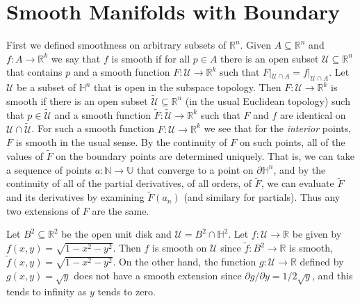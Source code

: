 \section{Smooth Manifolds with Boundary}
        First we defined smoothness on arbitrary subsets of $\mathbb{R}^{n}$.
        Given $A\subseteq\mathbb{R}^{n}$ and $f:A\rightarrow\mathbb{R}^{k}$ we
        say that $f$ is smooth if for all $p\in{A}$ there is an open subset
        $\mathcal{U}\subseteq\mathbb{R}^{n}$ that contains $p$ and a smooth
        function $F:\mathcal{U}\rightarrow\mathbb{R}^{k}$ such that
        $F|_{\mathcal{U}\cap{A}}=f|_{\mathcal{U}\cap{A}}$. Let $\mathcal{U}$ be
        a subset of $\mathbb{H}^{n}$ that is open in the subspace topology. Then
        $F:\mathcal{U}\rightarrow\mathbb{R}^{k}$ is smooth if there is an open
        subset $\tilde{\mathcal{U}}\subseteq\mathbb{R}^{n}$ (in the usual
        Euclidean topology) such that $p\in\tilde{\mathcal{U}}$ and a smooth
        function $\tilde{F}:\tilde{\mathcal{U}}\rightarrow\mathbb{R}^{k}$ such
        that $F$ and $f$ are identical on $\mathcal{U}\cap\tilde{\mathcal{U}}$.
        For such a smooth function $F:\mathcal{U}\rightarrow\mathbb{R}^{k}$ we
        see that for the \textit{interior} points, $F$ is smooth in the usual
        sense. By the continuity of $F$ on such points, all of the values of
        $\tilde{F}$ on the boundary points are determined uniquely. That is,
        we can take a sequence of points $a:\mathbb{N}\rightarrow\mathbb{U}$
        that converge to a point on $\partial\mathbb{H}^{n}$, and by the
        continuity of all of the partial derivatives, of all orders, of
        $\tilde{F}$, we can evaluate $\tilde{F}$ and its derivatives by
        examining $\tilde{F}(a_{n})$ (and similary for partials). Thus any two
        extensions of $F$ are the same.
        \begin{example}
            Let $B^{2}\subseteq\mathbb{R}^{2}$ be the open unit disk and
            $\mathcal{U}=B^{2}\cap\mathbb{H}^{2}$. Let
            $f:\mathcal{U}\rightarrow\mathbb{R}$ be given by
            $f(x,y)=\sqrt{1-x^{2}-y^{2}}$. Then $f$ is smooth on $\mathcal{U}$
            since $\tilde{f}:B^{2}\rightarrow\mathbb{R}$ is smooth,
            $\tilde{f}(x,y)=\sqrt{1-x^{2}-y^{2}}$. On the other hand, the
            function $g:\mathcal{U}\rightarrow\mathbb{R}$ defined by
            $g(x,y)=\sqrt{y}$ does not have a smooth extension since
            $\partial{g}/\partial{y}=1/2\sqrt{y}$, and this tends to infinity as
            $y$ tends to zero.
        \end{example}
